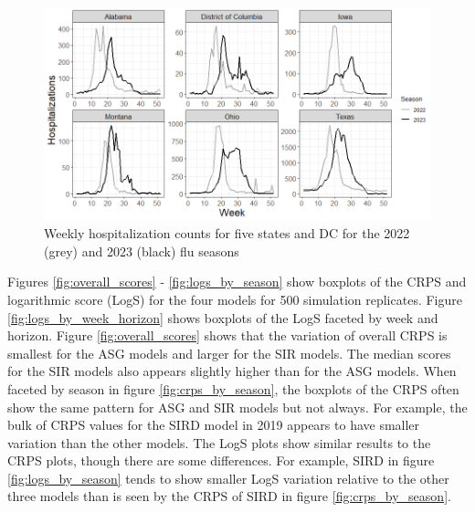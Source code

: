 \documentclass{article}
\begin{document}
\begin{figure}[hbt!]
    \centering
    \includegraphics[scale=.55]{Images/hosp_vs_week.png}
    \caption{Weekly hospitalization counts for five states and DC for the 2022 (grey) and 2023 (black) flu seasons}
    \label{fig:hosp_vs_week}
\end{figure}





% 






Figures \ref{fig:overall_scores} - \ref{fig:logs_by_season} show boxplots of the CRPS and logarithmic score (LogS) for the four models for 500 simulation replicates. Figure \ref{fig:logs_by_week_horizon} shows 
boxplots of the LogS faceted by week and horizon. Figure \ref{fig:overall_scores} shows that the variation of overall CRPS is smallest for the ASG models and larger for the SIR models. The median scores for the SIR models also appears slightly higher than for the ASG models. 
When faceted by season in figure \ref{fig:crps_by_season}, the boxplots of the CRPS often show the same pattern for ASG and SIR models but not always. For example, the bulk of CRPS values for the SIRD model in 2019 appears to have smaller variation than the other models.
The LogS plots show similar results to the CRPS plots, though there are some differences. For example, SIRD in figure \ref{fig:logs_by_season} tends to show smaller LogS variation relative to the other three models than is seen by the CRPS of SIRD in figure \ref{fig:crps_by_season}.
\end{document}

